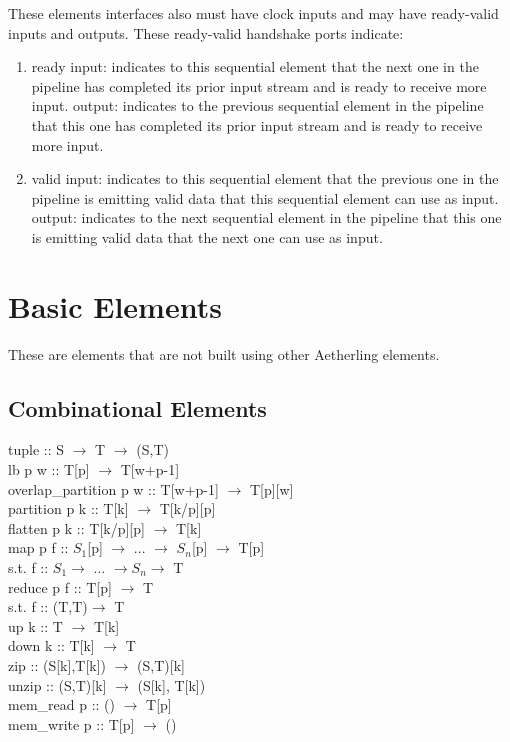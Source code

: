 \documentclass[11pt,fleqn]{article}
\numberwithin{equation}{subsection}
\begin{document}
These elements interfaces also must have clock inputs and may have ready-valid 
inputs and outputs. These ready-valid handshake ports indicate:
\begin{enumerate}
        \item ready
            \subitem input: indicates to this sequential element that the next 
            one in the pipeline has completed its prior input stream and is 
            ready to receive more input.
            \subitem output: indicates to the previous sequential element in the 
            pipeline that this one has completed its prior input stream and is
            ready to receive more input.
        \item valid
            \subitem input: indicates to this sequential element that the previous
            one in the pipeline is emitting valid data that this sequential 
            element can use as input.
            \subitem output: indicates to the next sequential element in the
            pipeline that this one is emitting valid data that the next one
            can use as input.
\end{enumerate}

\section{Basic Elements}
These are elements that are not built using other Aetherling elements.

\subsection{Combinational Elements}

\begin{adjustwidth}{2.5 em}{0 pt}
    tuple :: S $\rightarrow$ T $\rightarrow$ (S,T) \\
    lb p w :: T[p] $\rightarrow$ T[w+p-1] \\
    overlap\_partition p w :: T[w+p-1] $\rightarrow$ T[p][w] \\
    partition p k :: T[k] $\rightarrow$ T[k/p][p] \\
    flatten p k :: T[k/p][p] $\rightarrow$ T[k] \\
    map p f :: $S_1$[p] $\rightarrow$ ... $\rightarrow$ $S_n$[p] $\rightarrow$ 
    T[p] \\ \null \qquad s.t. f :: $S_1 \rightarrow$ ... $\rightarrow S_n \rightarrow$ T \\
    reduce p f :: T[p] $\rightarrow$ T \\ \null \qquad s.t. f :: (T,T)$\rightarrow$ T \\
    up k :: T $\rightarrow$ T[k] \\
    down k :: T[k] $\rightarrow$ T \\
    zip :: (S[k],T[k]) $\rightarrow$ (S,T)[k] \\
    unzip :: (S,T)[k] $\rightarrow$ (S[k], T[k]) \\
    mem\_read p :: () $\rightarrow$ T[p] \\
    mem\_write p :: T[p] $\rightarrow$ ()
\end{adjustwidth}
\end{document}
